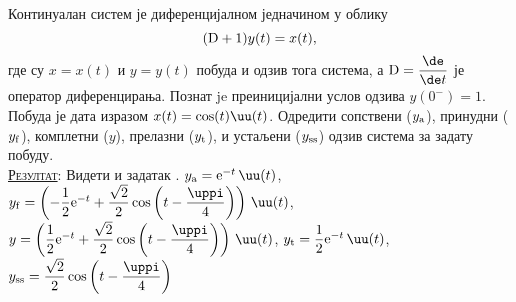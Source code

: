 \PID
Континуалан 
систем је 
диференцијалном једначином у облику 
$$
({\rm D} + 1) y(t) = x(t),
$$ где су 
$x = x(t)$ и $y = y(t)$ побуда и одзив 
тога система, а 
${\rm D} = \dfrac{\de}{\de t}$ је 
оператор диференцирања. 
Познат je преиницијални услов 
одзива $y(0^-) = 1$.
Побуда је дата изразом 
$x(t) = \cos(t) \uu(t)$. Одредити сопствени
($y_{\rm a}$), 
принудни
($y_{\rm f}$), 
комплетни
($y$), 
прелазни
($y_{\rm t}$),
 и устаљени
($y_{\rm ss}$) одзив система за задату побуду.
\\[2mm]

\textsc{\underline{Резултат}}: Видети и задатак \label{z:RL_kolo}.
$y_{\rm a} = {\rm e}^{-t} \, \uu(t)$, 
$y_{\rm f} = 
\left( 
-\dfrac{1}{2} {\rm e}^{-t} 
+ \dfrac{\sqrt 2}{2} 
\cos
\left(
t - \dfrac{\uppi}{4}
\right)
\right)\,\uu(t)$, \\
$y = 
\left( 
\dfrac{1}{2} {\rm e}^{-t} 
+ \dfrac{\sqrt 2}{2} 
\cos
\left(
t - \dfrac{\uppi}{4}
\right)
\right)\,\uu(t)
$, 
$
y_{\rm t} = 
\dfrac{1}{2} {\rm e}^{-t} \, \uu(t)
$,
$y_{\rm ss} = 
\dfrac{\sqrt 2}{ 2} 
\cos
\left(
t - \dfrac{\uppi}{4}
\right)
$

\filbreak